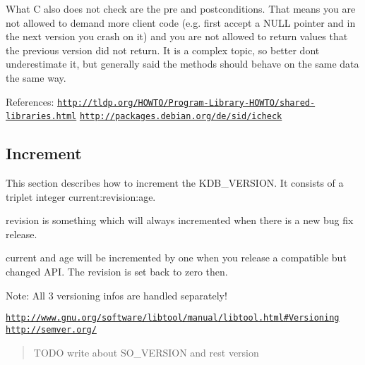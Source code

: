 What C also does not check are the pre and postconditions. That means you are not allowed to demand more client code (e.\+g. first accept a N\+U\+LL pointer and in the next version you crash on it) and you are not allowed to return values that the previous version did not return. It is a complex topic, so better don\textquotesingle{}t underestimate it, but generally said the methods should behave on the same data the same way.

References\+: \href{http://tldp.org/HOWTO/Program-Library-HOWTO/shared-libraries.html}{\tt http\+://tldp.\+org/\+H\+O\+W\+T\+O/\+Program-\/\+Library-\/\+H\+O\+W\+T\+O/shared-\/libraries.\+html} \href{http://packages.debian.org/de/sid/icheck}{\tt http\+://packages.\+debian.\+org/de/sid/icheck}

\subsection*{Increment}

This section describes how to increment the {\ttfamily K\+D\+B\+\_\+\+V\+E\+R\+S\+I\+ON}. It consists of a triplet integer {\ttfamily current\+:revision\+:age}.

{\ttfamily revision} is something which will always incremented when there is a new bug fix release.

{\ttfamily current} and {\ttfamily age} will be incremented by one when you release a compatible but changed A\+PI. The revision is set back to zero then.

Note\+: All 3 versioning infos are handled separately!

\href{http://www.gnu.org/software/libtool/manual/libtool.html#Versioning}{\tt http\+://www.\+gnu.\+org/software/libtool/manual/libtool.\+html\#\+Versioning} \href{http://semver.org/}{\tt http\+://semver.\+org/}

\begin{quote}
T\+O\+DO write about S\+O\+\_\+\+V\+E\+R\+S\+I\+ON and rest version\end{quote}
